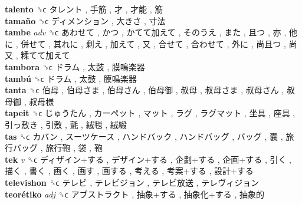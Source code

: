 \textbf{talento} ␝ϲ   タレント ,  手筋 ,  才 ,  才能 ,  筋   \\
\textbf{tamaño} ␝ϲ   ディメンション ,  大きさ ,  寸法   \\
\textbf{tambe} \emph{adv}  ␝ϲ   あわせて ,  かつ ,  かてて加えて ,  そのうえ ,  また ,  且つ ,  亦 ,  他に ,  併せて ,  其れに ,  剰え ,  加えて ,  又 ,  合せて ,  合わせて ,  外に ,  尚且つ ,  尚又 ,  糅てて加えて   \\
\textbf{tambora} ␝ϲ   ドラム ,  太鼓 ,  膜鳴楽器   \\
\textbf{tambú} ␝ϲ   ドラム ,  太鼓 ,  膜鳴楽器   \\
\textbf{tanta} ␝ϲ   伯母 ,  伯母さま ,  伯母さん ,  伯母御 ,  叔母 ,  叔母さま ,  叔母さん ,  叔母御 ,  叔母様   \\
\textbf{tapeit} ␝ϲ   じゅうたん ,  カーペット ,  マット ,  ラグ ,  ラグマット ,  坐具 ,  座具 ,  引っ敷き ,  引敷 ,  氈 ,  絨毯 ,  絨緞   \\
\textbf{tas} ␝ϲ   カバン ,  スーツケース ,  ハンドバック ,  ハンドバッグ ,  バッグ ,  嚢 ,  旅行バッグ ,  旅行鞄 ,  袋 ,  鞄   \\
\textbf{tek} \emph{v}  ␝ϲ   ディザイン+する ,  デザイン+する ,  企劃+する ,  企画+する ,  引く ,  描く ,  書く ,  画く ,  画す ,  画する ,  考える ,  考案+する ,  設計+する   \\
\textbf{televishon} ␝ϲ   テレビ ,  テレビジョン ,  テレビ放送 ,  テレヴィジョン   \\
\textbf{teorétiko} \emph{adj}  ␝ϲ   アブストラクト ,  抽象+する ,  抽象化+する ,  抽象的   \\
